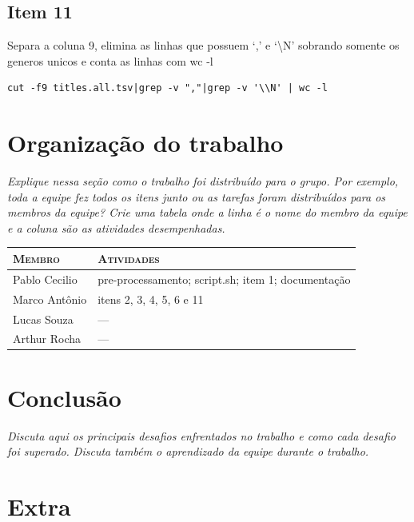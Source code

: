 \documentclass[12pt]{article}
\begin{document}
\subsection*{Item 11}

Separa a coluna 9, elimina as linhas que possuem `,' e `\textbackslash N' sobrando somente os generos unicos e conta as linhas com wc -l

\begin{verbatim}
cut -f9 titles.all.tsv|grep -v ","|grep -v '\\N' | wc -l
\end{verbatim}

\section{Organização do trabalho}

\emph{Explique nessa seção como o trabalho foi distribuído para o grupo.
Por exemplo, toda a equipe fez todos os itens junto ou as tarefas foram 
distribuídos para os membros da equipe? Crie uma tabela onde a linha é o
nome do membro da equipe e a coluna são as atividades desempenhadas.}

\begin{table}[!h]
    \begin{tabular}{p{5cm}p{7.5cm}}
    
        \textsc{Membro}      & \textsc{Atividades} \\ 
	    \hline
        Pablo Cecilio & pre-processamento; script.sh; item 1; documentação \\ 
        Marco Antônio & itens 2, 3, 4, 5, 6 e 11\\
        Lucas Souza & --- \\
        Arthur Rocha & --- \\

    \end{tabular}
\end{table}

\section{Conclusão}

\emph{Discuta aqui os principais desafios enfrentados no trabalho e como
cada desafio foi superado. Discuta também o aprendizado 
da equipe durante o trabalho.}

\pagebreak
\section{Extra}
\end{document}
